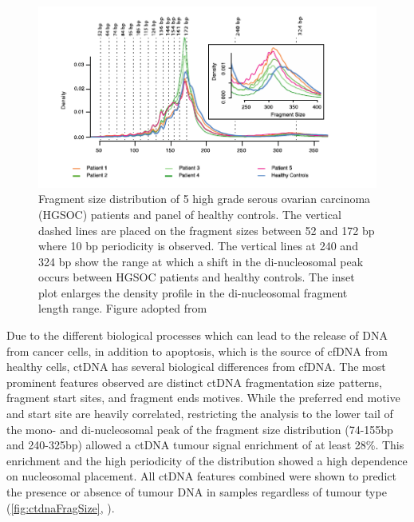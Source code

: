\begin{figure}[hbt]
\centering
\includegraphics[width=0.9\linewidth]{Figures/intro/fragmentSizeDist}
\caption[Fragment size distribution of ctDNA]{Fragment size distribution of 5 high grade serous
ovarian carcinoma (HGSOC) patients and panel of healthy controls. The vertical dashed lines are placed on the fragment sizes between 52 and 172 bp where 10 bp periodicity is observed. The vertical lines at 240 and 324 bp show the range at which a shift in the di-nucleosomal peak occurs between HGSOC patients and healthy controls. The inset plot enlarges the density profile in the di-nucleosomal fragment length range. Figure adopted from \textcite{Markus2022}}\label{fig:ctdnaFragSize}
\end{figure}

Due to the different biological processes which can lead to the release of DNA from cancer cells, in addition to apoptosis, which is the  source of cfDNA from healthy cells, ctDNA has several biological differences from cfDNA. The most prominent features observed are distinct ctDNA fragmentation size patterns, fragment start sites, and fragment ends motives. While the preferred end motive and start site are heavily correlated, restricting the analysis to the lower tail of the mono- and di-nucleosomal peak of the fragment size distribution (74-155bp and 240-325bp) allowed a ctDNA tumour signal enrichment of at least 28\%. This enrichment and the high periodicity of the distribution showed a high dependence on nucleosomal placement. All ctDNA features combined were shown to predict the presence or absence of tumour DNA in samples regardless of tumour type  (\autoref{fig:ctdnaFragSize}, \cite{Mouliere2018,Markus2022}).

 \cite{Posner2022}\cite{Tan2019} \cite{CamposCarrillo2020,PonsBelda2021,Duffy2021}
